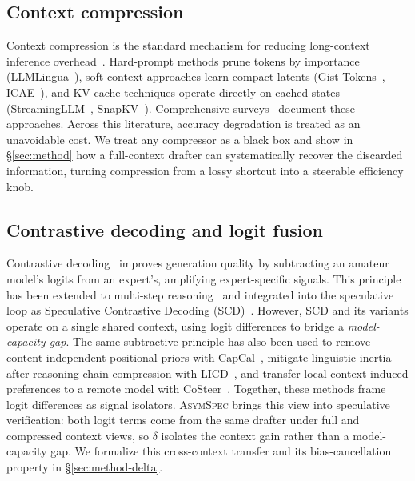 \documentclass[11pt]{article}
\newcommand{\crchange}[1]{#1}
\theoremstyle{plain}
\theoremstyle{definition}
\begin{document}
\subsection{Context compression}
Context compression is the standard mechanism for reducing long-context inference overhead~\crchange{\citep{lv-etal-2026-iecache}}. Hard-prompt methods prune tokens by importance (LLMLingua~\citep{longllmlingua2024,llmlingua2024}), soft-context approaches learn compact latents (Gist Tokens~\citep{gist2023}, ICAE~\citep{icae2024}), and KV-cache techniques operate directly on cached states (StreamingLLM~\citep{streamingllm2024}, SnapKV~\citep{snapkv2024}). Comprehensive surveys~\citep{promptcompsurvey2024} document these approaches. Across this literature, accuracy degradation is treated as an unavoidable cost. We treat any compressor as a black box and show in \S\ref{sec:method} how a full-context drafter can systematically recover the discarded information, turning compression from a lossy shortcut into a steerable efficiency knob.

\subsection{Contrastive decoding and logit fusion}
Contrastive decoding~\citep{li2023contrastive} improves generation quality by subtracting an amateur model's logits from an expert's, amplifying expert-specific signals. This principle has been extended to multi-step reasoning~\citep{obrien2023cdreasoning} and integrated into the speculative loop as Speculative Contrastive Decoding (SCD)~\citep{yuan2023scd}. However, SCD and its variants operate on a single shared context, using logit differences to bridge a \emph{model-capacity gap}. \crchange{The same subtractive principle has also been used to remove content-independent positional priors with CapCal~\citep{lv-etal-2026-learning}, mitigate linguistic inertia after reasoning-chain compression with LICD~\citep{zhang2026thinkinghurtsdiagnosingrectifying}, and transfer local context-induced preferences to a remote model with CoSteer~\citep{lv-etal-2025-costeer}. Together, these methods frame logit differences as signal isolators. \textsc{AsymSpec} brings this view into speculative verification: both logit terms come from the same drafter under full and compressed context views, so $\delta$ isolates the context gain rather than a model-capacity gap.} We formalize this cross-context transfer and its bias-cancellation property in \S\ref{sec:method-delta}.
\end{document}

